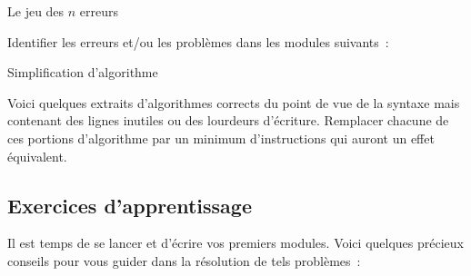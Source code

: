 \begin{Exercice}{Le jeu des $n$ erreurs}

	Identifier les erreurs et/ou les
	problèmes dans les modules suivants~:



\end{Exercice}

\begin{Exercice}{Simplification d'algorithme}

	Voici quelques extraits d’algorithmes corrects du point de vue de la
	syntaxe mais contenant des lignes inutiles ou des lourdeurs d’écriture.
	Remplacer chacune de ces portions d’algorithme par un minimum
	d’instructions qui auront un effet équivalent.





\end{Exercice}

\subsection{Exercices d’apprentissage}

	Il est temps de se lancer et d'écrire vos premiers
	modules. Voici quelques précieux conseils pour vous 
	guider dans la résolution de tels problèmes~:

